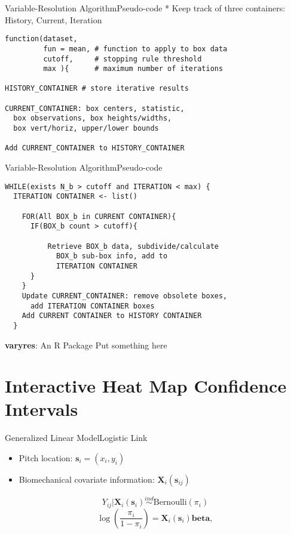 \documentclass{beamer}
\begin{document}
\begin{frame}[fragile]{Variable-Resolution Algorithm}{Pseudo-code}
* Keep track of three containers: History, Current, Iteration
\begin{verbatim}
function(dataset, 
         fun = mean, # function to apply to box data
         cutoff,     # stopping rule threshold
         max ){      # maximum number of iterations
         
HISTORY_CONTAINER # store iterative results

CURRENT_CONTAINER: box centers, statistic, 
  box observations, box heights/widths, 
  box vert/horiz, upper/lower bounds

Add CURRENT_CONTAINER to HISTORY_CONTAINER
\end{verbatim}
\end{frame}

\begin{frame}[fragile]{Variable-Resolution Algorithm}{Pseudo-code}
\begin{verbatim}
WHILE(exists N_b > cutoff and ITERATION < max) {
  ITERATION CONTAINER <- list()
  
    FOR(All BOX_b in CURRENT CONTAINER){
      IF(BOX_b count > cutoff){ 
      
          Retrieve BOX_b data, subdivide/calculate 
            BOX_b sub-box info, add to 
            ITERATION CONTAINER  
      } 
    }  
    Update CURRENT_CONTAINER: remove obsolete boxes,
      add ITERATION CONTAINER boxes
    Add CURRENT CONTAINER to HISTORY CONTAINER 
  }

\end{verbatim}
\end{frame}

\begin{frame}{{\bf varyres}: An R Package}
Put something here
\end{frame}

\section{Interactive Heat Map Confidence Intervals}

\begin{frame}{Generalized Linear Model}{Logistic Link}
\begin{itemize}
  \addtolength{\itemsep}{0.5\baselineskip}
\item Pitch location: $\mathbf{s}_{i} = (x_{i},y_{i})$ 
\item Biomechanical covariate information: $\mathbf{X}_{i}(\mathbf{s}_{ij})$
\end{itemize}
$$Y_{ij}|\mathbf{X}_{i}(\mathbf{s}_{i}) \stackrel{ind}{\sim} \mbox{Bernoulli}(\pi_{i}) $$
$$
\log\left(\frac{\pi_{i}}{1-\pi_{i}}\right) = \mathbf{X}_{i}(\mathbf{s}_{i})\pmb{beta},
$$
\end{frame}
\end{document}
